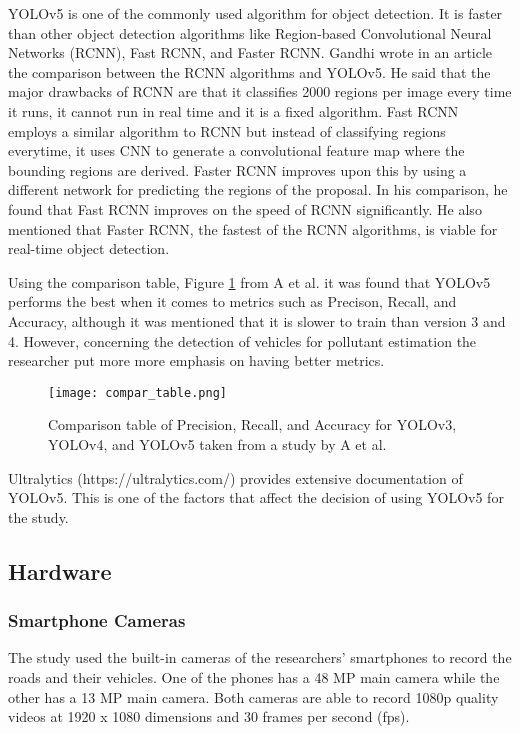 	YOLOv5 is one of the commonly used algorithm for object detection. It is faster than other object detection algorithms like Region-based Convolutional Neural Networks (RCNN), Fast RCNN, and Faster RCNN. Gandhi \citeyear{gandhi_2018} wrote in an article the comparison between the RCNN algorithms and YOLOv5. He said that the major drawbacks of RCNN are that it classifies 2000 regions per image every time it runs, it cannot run in real time and it is a fixed algorithm. Fast RCNN employs a similar algorithm to RCNN but instead of classifying regions everytime, it uses CNN to generate a convolutional feature map where the bounding regions are derived. Faster RCNN improves upon this by using a different network for predicting the regions of the proposal. In his comparison, he found that Fast RCNN improves on the speed of RCNN significantly. He also mentioned that Faster RCNN, the fastest of the RCNN algorithms, is viable for real-time object detection. 
	
	Using the comparison table, Figure \ref{fig:compar_table} from A et al. \citeyear{RAMYA} it was found that YOLOv5 performs the best when it comes to metrics such as Precison, Recall, and Accuracy, although it was mentioned that it is slower to train than version 3 and 4. However, concerning the detection of vehicles for pollutant estimation the researcher put more more emphasis on having better metrics. 
	
	\begin{figure}[!htbp]
		\centering
		\texttt{[image: compar\_table.png]}
		\caption{Comparison table of Precision, Recall, and Accuracy for YOLOv3, YOLOv4, and YOLOv5 taken from a study by A et al.}
		\label{fig:compar_table}
	\end{figure}
	\FloatBarrier



Ultralytics (https://ultralytics.com/) provides extensive documentation of YOLOv5. This is one of the factors that affect the decision of using YOLOv5 for the study.



\subsection{Hardware}

\subsubsection{Smartphone Cameras}
The study used the built-in cameras of the researchers' smartphones to record the roads and their vehicles. One of the phones has a 48 MP main camera while the other has a 13 MP main camera. Both cameras are able to record 1080p quality videos at 1920 x 1080 dimensions and 30 frames per second (fps).

